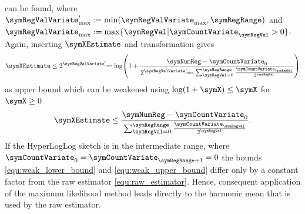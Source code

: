 \documentclass[a4paper]{scrartcl}
\begin{document}
can be found, where $\symRegValVariate'_\text{max} := \min(\symRegValVariate_\text{max}, \symRegRange)$ and
$\symRegValVariate_\text{max} := \max\lbrace \symRegVal\vert\symCountVariate_\symRegVal>0\rbrace$.
Again, inserting $\symXEstimate$ and transformation gives
\begin{equation}
\label{equ:strong_upper_bound}
\symXEstimate
\leq
2^{\symRegValVariate'_\text{max}}
\log\!\left(
1+
\frac{\symNumReg-\symCountVariate_0}
{
2^{\symRegValVariate'_\text{max}}
\sum_{\symRegVal=0}^{\symRegRange}
\frac{\symCountVariate_\symRegVal}{2^\symRegVal}
}
\right)
\end{equation}
as upper bound which can be weakened using $\log(1+\symX)\leq \symX$ for $\symX\geq 0$
\begin{equation}
\label{equ:weak_upper_bound}
\symXEstimate
\leq
\frac{\symNumReg-\symCountVariate_0}
{\sum_{\symRegVal=0}^{\symRegRange}
\frac{\symCountVariate_\symRegVal}{2^\symRegVal}}.
\end{equation}
If the HyperLogLog sketch is in the intermediate range, where $\symCountVariate_0=\symCountVariate_{\symRegRange+1}=0$ the bounds \eqref{equ:weak_lower_bound} and \eqref{equ:weak_upper_bound} differ only by a constant factor from the raw estimator \eqref{equ:raw_estimator}. Hence, consequent application of the maximum likelihood method leads directly to the harmonic mean that is used by the raw estimator.
\end{document}
